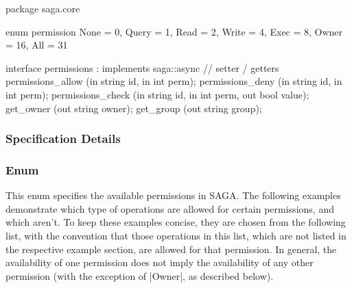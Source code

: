  \begin{myspec}
  package saga.core
  {
    enum permission
    {
      None      =  0,
      Query     =  1,
      Read      =  2,
      Write     =  4,
      Exec      =  8,
      Owner     = 16,
      All       = 31
    }
 
    interface permissions : implements saga::async
    {
      // setter / getters
      permissions_allow       (in  string          id,
                               in  int             perm);
      permissions_deny        (in  string          id,
                               in  int             perm);
      permissions_check       (in  string          id,
                               in  int             perm,
                               out bool            value);
      get_owner               (out string          owner);
      get_group               (out string          group);
    }
  }
 \end{myspec}
 
 
 \subsubsection{Specification Details}
 
 \subsubsection*{Enum }
 
  This enum specifies the available permissions in SAGA.  The
  following examples demonstrate which type of operations are
  allowed for certain permissions, and which aren't.  To keep
  these examples concise, they are chosen from the following
  list, with the convention that those operations in this list,
  which are not listed in the respective example section, are
   allowed for that permission.  In general, the
  availability of one permission does not imply the availability
  of any other permission (with the exception of |Owner|, as
  described below).
 
